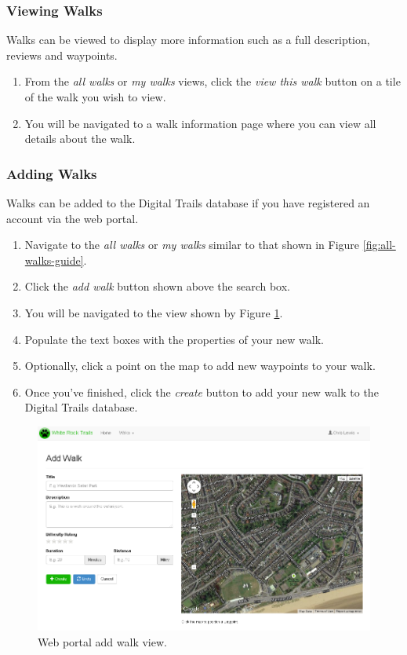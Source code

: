 \documentclass[11pt,a4paper]{report}
\begin{document}
\subsubsection{Viewing Walks}

Walks can be viewed to display more information such as a full description, reviews and waypoints.

\begin{enumerate}
\item From the \emph{all walks} or \emph{my walks} views, click the \emph{view this walk} button on a tile of the walk you wish to view.
\item You will be navigated to a walk information page where you can view all details about the walk.
\end{enumerate}

\subsubsection{Adding Walks}

Walks can be added to the Digital Trails database if you have registered an account via the web portal.

\begin{enumerate}
\item Navigate to the \emph{all walks} or \emph{my walks} similar to that shown in Figure \ref{fig:all-walks-guide}.
\item Click the \emph{add walk} button shown above the search box.
\item You will be navigated to the view shown by Figure \ref{fig:add-walk-guide}.
\item Populate the text boxes with the properties of your new walk.
\item Optionally, click a point on the map to add new waypoints to your walk.
\item Once you've finished, click the \emph{create} button to add your new walk to the Digital Trails database.
\end{enumerate}

\begin{figure}[H]
\centering
\includegraphics[width=0.8\linewidth]{./img/webportal/add-walk}
\caption{Web portal add walk view.}
\label{fig:add-walk-guide}
\end{figure}
\end{document}
